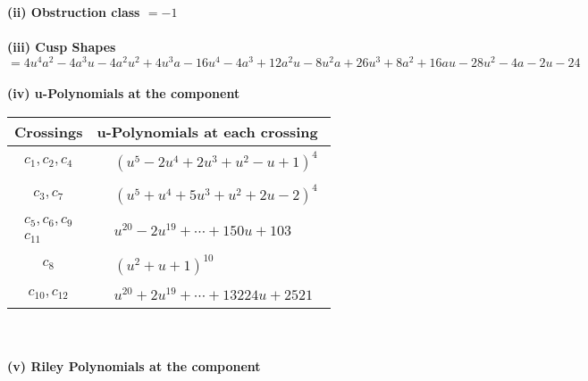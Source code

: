 \documentclass[1p]{elsarticle_modified}
\theoremstyle{definition}
\begin{document}
\flushleft \textbf{(ii) Obstruction class $= -1$}\\~\\
\flushleft \textbf{(iii) Cusp Shapes $= 4 u^4 a^2-4 a^3 u-4 a^2 u^2+4 u^3 a-16 u^4-4 a^3+12 a^2 u-8 u^2 a+26 u^3+8 a^2+16 a u-28 u^2-4 a-2 u-24$}\\~\\
\newpage\renewcommand{\arraystretch}{1}
\flushleft \textbf{(iv) u-Polynomials at the component}\newline \\
\begin{tabular}{m{50pt}|m{274pt}}
Crossings & \hspace{64pt}u-Polynomials at each crossing \\
\hline $$\begin{aligned}c_{1},c_{2},c_{4}\end{aligned}$$&$\begin{aligned}
&(u^5-2 u^4+2 u^3+u^2- u+1)^4
\end{aligned}$\\
\hline $$\begin{aligned}c_{3},c_{7}\end{aligned}$$&$\begin{aligned}
&(u^5+u^4+5 u^3+u^2+2 u-2)^4
\end{aligned}$\\
\hline $$\begin{aligned}c_{5},c_{6},c_{9}\\c_{11}\end{aligned}$$&$\begin{aligned}
&u^{20}-2 u^{19}+\cdots+150 u+103
\end{aligned}$\\
\hline $$\begin{aligned}c_{8}\end{aligned}$$&$\begin{aligned}
&(u^2+u+1)^{10}
\end{aligned}$\\
\hline $$\begin{aligned}c_{10},c_{12}\end{aligned}$$&$\begin{aligned}
&u^{20}+2 u^{19}+\cdots+13224 u+2521
\end{aligned}$\\
\hline
\end{tabular}\\~\\
\newpage\renewcommand{\arraystretch}{1}
\flushleft \textbf{(v) Riley Polynomials at the component}\newline \\
\end{document}
